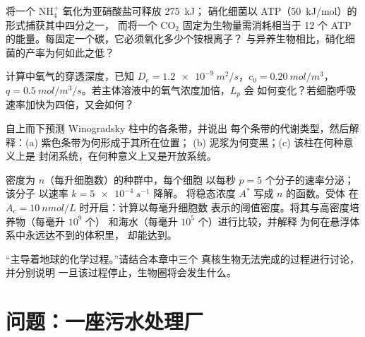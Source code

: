 \begin{exercise}[$\star\star$]\label{exo:b2:microbial-metabolism:8}
将一个 $\mathrm{NH_4^+}$ 氧化为亚硝酸盐可释放 \qty{275}{kJ}；
硝化细菌以 ATP（\qty{50}{kJ/mol}）的形式捕获其中四分之一，
而将一个 $\mathrm{CO_2}$ 固定为生物量需消耗相当于
12 个 ATP 的能量。每固定一个碳，它必须氧化多少个铵根离子？
与异养生物相比，硝化细菌的产率为何如此之低？
\end{exercise}

\begin{exercise}[$\star\star$]\label{exo:b2:microbial-metabolism:9}
计算中氧气的穿透深度，已知 $D_e =
\qty{1.2e-9}{m^2/s}$，$c_0 = \qty{0.20}{mol/m^3}$，$q =
\qty{0.5}{mol/m^3/s}$。若主体溶液中的氧气浓度加倍，$L_p$ 会
如何变化？若细胞呼吸速率加快为四倍，又会如何？
\end{exercise}

\begin{exercise}[$\star\star\star$]\label{exo:b2:microbial-metabolism:10}
自上而下预测 Winogradsky 柱中的各条带，并说出
每个条带的代谢类型，然后解释：(a) 紫色条带为何形成于其所在位置；
(b) 泥浆为何变黑；(c) 该柱在何种意义上是
封闭系统，在何种意义上又是开放系统。
\end{exercise}

\begin{exercise}[$\star\star\star$]\label{exo:b2:microbial-metabolism:11}
密度为 $n$（每升细胞数）的种群中，每个细胞
以每秒 $p = 5$ 个分子的速率分泌；该分子
以速率 $k = \qty{5e-4}{s^{-1}}$ 降解。
将稳态浓度 $A^*$ 写成 $n$ 的函数。受体
在 $A_c = \qty{10}{nmol/L}$ 时开启：计算以每毫升细胞数
表示的阈值密度。将其与高密度培养物（每毫升 $10^{9}$ 个）
和海水（每毫升 $10^{5}$ 个）进行比较，并解释
为何在悬浮体系中永远达不到的体积里，
却能达到。
\end{exercise}

\begin{exercise}[$\star\star\star$]\label{exo:b2:microbial-metabolism:12}
“主导着地球的化学过程。”请结合本章中三个
真核生物无法完成的过程进行讨论，并分别说明
一旦该过程停止，生物圈将会发生什么。
\end{exercise}

\section{问题：一座污水处理厂}

